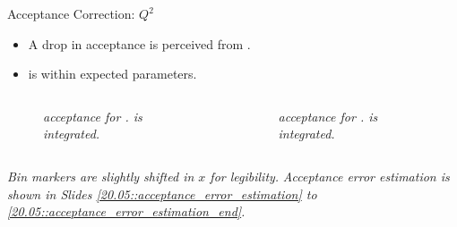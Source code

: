 \begin{frame}{Acceptance Correction: $Q^2$}
    \label{11.52::electron_variables}

    \begin{itemize}
        \item
            A drop in  acceptance is perceived from .

        \item
            \ef{$\nu$} is within expected parameters.
    \end{itemize}

    \vspace{-12pt}
    \begin{columns}[onlytextwidth,T]

    \begin{column}{.49\linewidth}
        \begin{center}
            \begin{figure}[t]
                \textit{
                     acceptance for .
                    \ef{$\nu$} is integrated.
                }
            \end{figure}
        \end{center}
    \end{column}

    \begin{column}{.49\linewidth}
        \begin{center}
            \begin{figure}[t]
                \textit{
                    \ef{$\nu$} acceptance for .
                     is integrated.
                }
            \end{figure}
        \end{center}
    \end{column}

    \end{columns}

    \begin{flushright}
        \tiny{\textit{Bin markers are slightly shifted in $x$ for legibility.}}
        \tiny{\textit{Acceptance error estimation is shown in Slides \textcolor{efd_purple}{\ref{20.05::acceptance_error_estimation}} to \textcolor{efd_purple}{\ref{20.05::acceptance_error_estimation_end}}.}}
    \end{flushright}
\end{frame}

